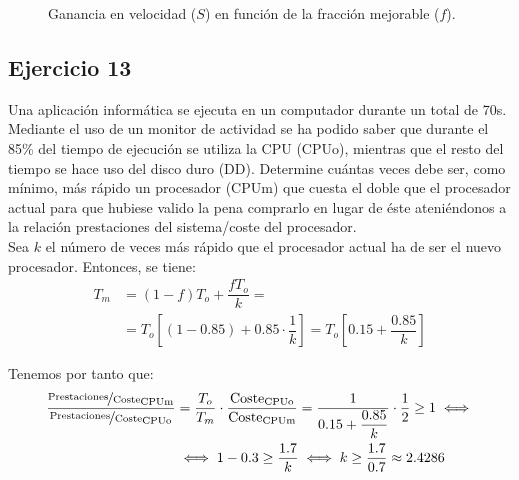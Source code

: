 \begin{enumerate}
\begin{figure}
        \caption{Ganancia en velocidad ($S$) en función de la fracción mejorable ($f$).}
        \label{fig:1_2_solucion}
    \end{figure}

\end{enumerate}

\subsection*{Ejercicio 13}
Una aplicación informática se ejecuta en un computador durante un total de 70s. Mediante el uso de un monitor de actividad se ha podido saber que durante el 85\% del tiempo de ejecución se utiliza la CPU (CPUo), mientras que el resto del tiempo se hace uso del disco duro (DD). Determine cuántas veces debe ser, como mínimo, más rápido un procesador (CPUm) que cuesta el doble que el procesador actual para que hubiese valido la pena comprarlo en lugar de éste ateniéndonos a la relación prestaciones del sistema/coste del procesador.\\

Sea $k$ el número de veces más rápido que el procesador actual ha de ser el nuevo procesador. Entonces, se tiene:
\begin{align*}
    T_m &= (1-f)T_o + \dfrac{fT_o}{k}
    =\\&= T_o\left[(1-0.85) + 0.85\cdot \dfrac{1}{k}\right]
    = T_o\left[0.15 + \dfrac{0.85}{k}\right]
\end{align*}

Tenemos por tanto que:
\begin{align*}
    \dfrac{\nicefrac{\text{Prestaciones}}{\text{Coste}}_{\text{CPUm}}}{\nicefrac{\text{Prestaciones}}{\text{Coste}}_{\text{CPUo}}} &= \dfrac{T_o}{T_m}\cdot \dfrac{\text{Coste}_{\text{CPUo}}}{\text{Coste}_{\text{CPUm}}}
    = \dfrac{1}{0.15 + \dfrac{0.85}{k}}\cdot \dfrac{1}{2}  \geq 1\iff 
    \\ &\iff 1-0.3\geq \dfrac{1.7}{k}\iff k\geq \dfrac{1.7}{0.7} \approx 2.4286
\end{align*}

